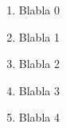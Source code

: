 \documentclass[a4paper,11pt]{article}
\date{}
\begin{document}
\begin{enumerate}
\item Blabla 0
\item Blabla 1
\item Blabla 2
\item Blabla 3
\item Blabla 4

\end{enumerate}
\end{document}
